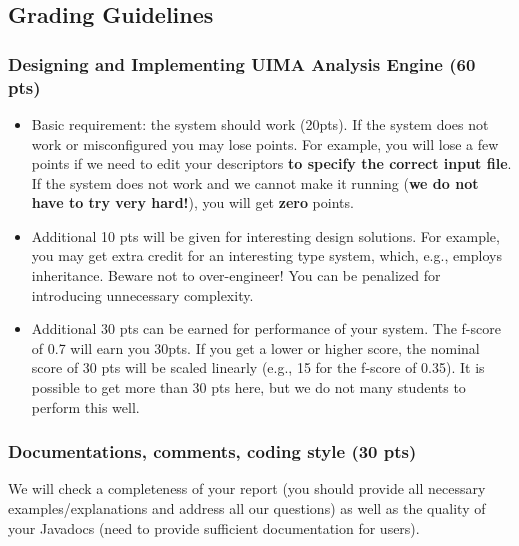 
\subsection{Grading Guidelines}

\subsubsection{Designing and Implementing UIMA Analysis Engine (60 pts)}

\begin{itemize}

\item Basic requirement: the system should work (20pts). 
If the system does not work or misconfigured you may lose points.
For example, you will lose a few points if we need to edit your descriptors
\textbf{to specify the correct input file}.
If the system does not work and we cannot make it running (\textbf{we do 
not have to try very hard!}), you will get \textbf{zero} points.

\item Additional 10 pts will be given for interesting design solutions.
For example, you may get extra credit for an interesting type system,
which, e.g., employs inheritance. 
Beware not to over-engineer! You can be penalized for introducing
unnecessary complexity.

\item Additional 30 pts can be earned for performance of your system. 
The f-score of 0.7 will earn you 30pts.
If you get a lower or higher score, the nominal score of 30 pts will be scaled linearly (e.g.,
15 for the f-score of 0.35).
It is possible to get more than 30 pts here, but we do not many students
to perform this well.

\end{itemize}

\subsubsection{Documentations, comments, coding style (30 pts)}

We will check a completeness of your report (you should provide
all necessary examples/explanations and address all our questions)
as well as the quality of your Javadocs (need to provide sufficient
documentation for users).

